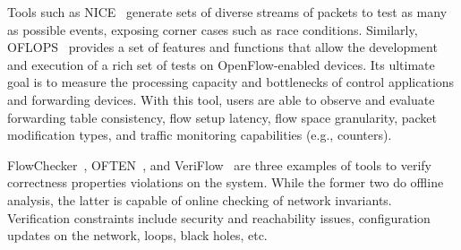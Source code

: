 

Tools such as NICE~\cite{canini2012-1} generate sets of diverse streams of packets 
to test as many as possible events, exposing corner cases such as race conditions.
Similarly, OFLOPS~\cite{rotsos2012-1} provides a set of features and functions that allow 
the development and execution of a rich set of tests on OpenFlow-enabled devices. 
Its ultimate 
goal is to measure the processing capacity and bottlenecks of control applications and forwarding devices.
With this tool, users are able to observe and evaluate forwarding table consistency, flow setup latency, 
flow space granularity, packet modification types, and traffic monitoring capabilities (e.g., counters).

FlowChecker~\cite{al-shaer2010}, OFTEN~\cite{kuzniar2012}, and VeriFlow~\cite{khurshid2012} are three examples of tools to verify correctness 
properties violations on the system. While the former two do offline analysis, the latter is capable of 
online checking of network invariants. Verification constraints include security and reachability issues, 
configuration updates on the network, loops, black holes, etc.

